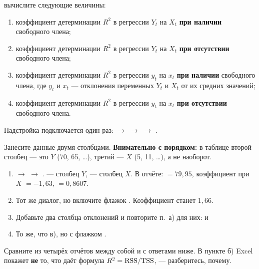 \noindent вычислите следующие величины:
\begin{enumerate}[label=\asbuk*), leftmargin=2.2em, itemsep=3pt]
  \item коэффициент детерминации $R^2$ в регрессии $Y_t$ на $X_t$
        \textbf{при наличии} свободного члена;
  \item коэффициент детерминации $R^2$ в регрессии $Y_t$ на $X_t$
        \textbf{при отсутствии} свободного члена;
  \item коэффициент детерминации $R^2$ в регрессии $y_t$ на $x_t$
        \textbf{при наличии} свободного члена, где $y_t$ и $x_t$ --- отклонения
        переменных $Y_t$ и $X_t$ от их средних значений;
  \item коэффициент детерминации $R^2$ в регрессии $y_t$ на $x_t$
        \textbf{при отсутствии} свободного члена.
\end{enumerate}

\begin{excel}
Надстройка подключается один раз:  $\to$  $\to$
 $\to$ .

\smallskip
Занесите данные двумя столбцами. \textbf{Внимательно с порядком:} в таблице
второй столбец --- это $Y$ (70, 65, \dots), третий --- $X$ (5, 11, \dots),
а не наоборот.
\begin{enumerate}[label=\asbuk*), leftmargin=2.2em, itemsep=2pt, topsep=3pt]
  \item {} $\to$  $\to$ .
         --- столбец $Y$,  ---
        столбец $X$. В отчёте:  $=79{,}95$, коэффициент при
        $X$ $=-1{,}63$,  $=0{,}8607$.
  \item Тот же диалог, но включите флажок .
        Коэффициент станет $1{,}66$.
  \item Добавьте два столбца отклонений и повторите п.~а) для них:\newline
         \quad и \quad {}
  \item То же, что в), но с флажком .
\end{enumerate}

\smallskip
Сравните  из четырёх отчётов между собой и с ответами ниже.
В пункте б) Excel покажет \textbf{не} то, что даёт формула
$R^2 = \mathrm{RSS}/\mathrm{TSS}$, --- разберитесь, почему.
\end{excel}

